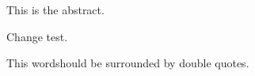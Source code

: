 This is the abstract.

Change test.


This \textquotedbl word\textquotedbl should be surrounded by double quotes.

